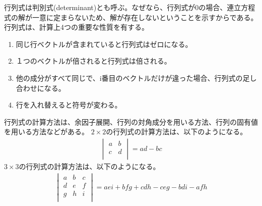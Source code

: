 \documentclass{ltjsarticle}
\begin{document}
\par
行列式は判別式(determinant)とも呼ぶ。なぜなら、行列式が0の場合、連立方程式の解が一意に定まらないため、解が存在しないということを示すからである。
行列式は、計算上4つの重要な性質を有する。
\begin{enumerate}
\item 同じ行ベクトルが含まれていると行列式はゼロになる。
\item １つのベクトルが\lambda 倍されると行列式は\lambda 倍される。
\item 他の成分がすべて同じで、i番目のベクトルだけが違った場合、行列式の足し合わせになる。
\item 行を入れ替えると符号が変わる。
\end{enumerate}
行列式の計算方法は、余因子展開、行列の対角成分を用いる方法、行列の固有値を用いる方法などがある。
$2\times2$の行列式の計算方法は、以下のようになる。
\begin{align}
\begin{vmatrix}
  a & b \\
  c & d \\
\end{vmatrix}
= ad - bc
\end{align}
$3\times3$の行列式の計算方法は、以下のようになる。
\begin{align}
\begin{vmatrix}
  a & b & c \\
  d & e & f \\
  g & h & i \\
\end{vmatrix}
= aei + bfg + cdh - ceg - bdi - afh
\end{align}

\newpage
\end{document}
